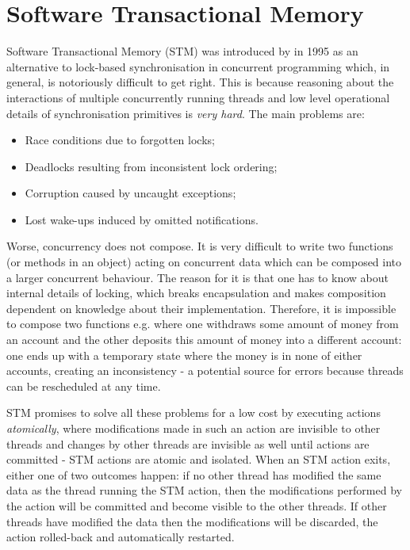 \section{Software Transactional Memory}
Software Transactional Memory (STM) was introduced by \cite{shavit_software_1995} in 1995 as an alternative to lock-based synchronisation in concurrent programming which, in general, is notoriously difficult to get right. This is because reasoning about the interactions of multiple concurrently running threads and low level operational details of synchronisation primitives is \textit{very hard}. The main problems are:

\begin{itemize}
	\item Race conditions due to forgotten locks;
	\item Deadlocks resulting from inconsistent lock ordering;
	\item Corruption caused by uncaught exceptions;
	\item Lost wake-ups induced by omitted notifications.
\end{itemize}

Worse, concurrency does not compose. It is very difficult to write two functions (or methods in an object) acting on concurrent data which can be composed into a larger concurrent behaviour. The reason for it is that one has to know about internal details of locking, which breaks encapsulation and makes composition dependent on knowledge about their implementation. Therefore, it is impossible to compose two  functions e.g. where one withdraws some amount of money from an account and the other deposits this amount of money into a different account: one ends up with a temporary state where the money is in none of either accounts, creating an inconsistency - a potential source for errors because threads can be rescheduled at any time.

STM promises to solve all these problems for a low cost by executing actions \textit{atomically}, where modifications made in such an action are invisible to other threads and changes by other threads are invisible as well until actions are committed - STM actions are atomic and isolated. When an STM action exits, either one of two outcomes happen: if no other thread has modified the same data as the thread running the STM action, then the modifications performed by the action will be committed and become visible to the other threads. If other threads have modified the data then the modifications will be discarded, the action rolled-back and automatically restarted.

